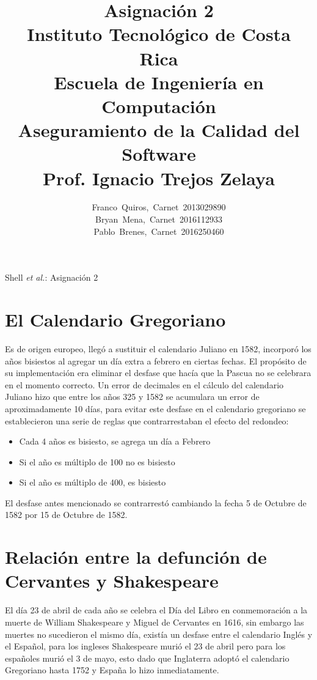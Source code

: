 \documentclass[10pt,journal,compsoc]{IEEEtran}
\begin{document}
	\title{Asignaci\'on 2 \\ \large Instituto Tecnol\'ogico de Costa Rica \\ Escuela de Ingenier\'ia en Computaci\'on\\ Aseguramiento de la Calidad del Software\\ Prof. Ignacio Trejos Zelaya}
	
	
	\author{Franco~Quiros,~Carnet~2013029890\\ Bryan~Mena,~Carnet~2016112933\\ Pablo~Brenes,~Carnet~2016250460}
	
	{Shell \MakeLowercase{\textit{et al.}}: Asignaci\'on 2}
	\maketitle
	
	\IEEEdisplaynontitleabstractindextext
	
	\IEEEpeerreviewmaketitle
	
	\section{El Calendario Gregoriano}
	\par Es de origen europeo, llegó a sustituir el calendario Juliano en 1582, incorporó los años bisiestos al agregar un día extra a febrero en ciertas fechas. El propósito de su implementación era eliminar el desfase que hacía que la Pascua no se celebrara en el momento correcto. Un error de decimales en el cálculo del calendario Juliano hizo que entre los años 325 y 1582 se acumulara un error de aproximadamente 10 días, para evitar este desfase en el calendario gregoriano se establecieron una serie de reglas que contrarrestaban el efecto del redondeo:
	\begin{itemize}
		\item Cada 4 años es bisiesto, se agrega un día a Febrero
		\item Si el año es múltiplo de 100 no es bisiesto
		\item Si el año es múltiplo de 400, es bisiesto
	\end{itemize}
	\par El desfase antes mencionado se contrarrestó cambiando la fecha 5 de Octubre de 1582 por 15 de Octubre de 1582.
	
	\section{Relación entre la defunción de Cervantes y Shakespeare}
	\par El día 23 de abril de cada año se celebra el Día del Libro en conmemoración a la muerte de William Shakespeare y Miguel de Cervantes en 1616, sin embargo las muertes no sucedieron el mismo día, existía un desfase entre el calendario Inglés y el Español, para los ingleses Shakespeare murió el 23 de abril pero para los españoles murió el 3 de mayo, esto dado que Inglaterra adoptó el calendario Gregoriano hasta 1752 y España lo hizo inmediatamente.
	
\end{document}
